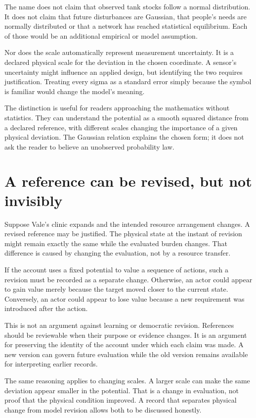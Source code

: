 The name does not claim that observed tank stocks follow a normal distribution. It does not claim that future disturbances are Gaussian, that people's needs are normally distributed or that a network has reached statistical equilibrium. Each of those would be an additional empirical or model assumption.

Nor does the scale automatically represent measurement uncertainty. It is a declared physical scale for the deviation in the chosen coordinate. A sensor's uncertainty might influence an applied design, but identifying the two requires justification. Treating every sigma as a standard error simply because the symbol is familiar would change the model's meaning.

The distinction is useful for readers approaching the mathematics without statistics. They can understand the potential as a smooth squared distance from a declared reference, with different scales changing the importance of a given physical deviation. The Gaussian relation explains the chosen form; it does not ask the reader to believe an unobserved probability law.

\section{A reference can be revised, but not invisibly}
Suppose Vale's clinic expands and the intended resource arrangement changes. A revised reference may be justified. The physical state at the instant of revision might remain exactly the same while the evaluated burden changes. That difference is caused by changing the evaluation, not by a resource transfer.

If the account uses a fixed potential to value a sequence of actions, such a revision must be recorded as a separate change. Otherwise, an actor could appear to gain value merely because the target moved closer to the current state. Conversely, an actor could appear to lose value because a new requirement was introduced after the action.

This is not an argument against learning or democratic revision. References should be reviewable when their purpose or evidence changes. It is an argument for preserving the identity of the account under which each claim was made. A new version can govern future evaluation while the old version remains available for interpreting earlier records.

The same reasoning applies to changing scales. A larger scale can make the same deviation appear smaller in the potential. That is a change in evaluation, not proof that the physical condition improved. A record that separates physical change from model revision allows both to be discussed honestly.

